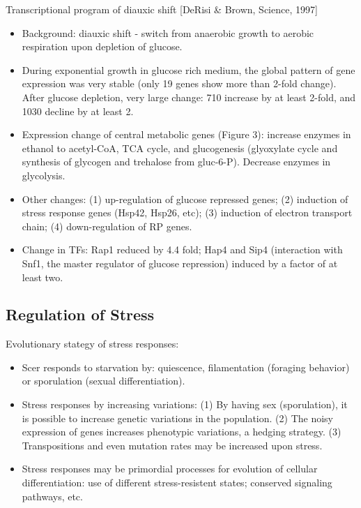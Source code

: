 \documentclass{report}
\begin{document}
Transcriptional program of diauxic shift [DeRisi \& Brown, Science, 1997]
\begin{itemize}
\item Background: diauxic shift - switch from anaerobic growth to aerobic respiration upon depletion of glucose. 

	\item During exponential growth in glucose rich medium, the global pattern of gene expression was very stable (only 19 genes show more than 2-fold change). After glucose depletion, very large change: 710 increase by at least 2-fold, and 1030 decline by at least 2. 
	\item Expression change of central metabolic genes (Figure 3): increase enzymes in ethanol to acetyl-CoA, TCA cycle, and glucogenesis (glyoxylate cycle and synthesis of glycogen and trehalose from gluc-6-P). Decrease enzymes in glycolysis. 
	\item Other changes: (1) up-regulation of glucose repressed genes; (2) induction of stress response genes (Hsp42, Hsp26, etc); (3) induction of electron transport chain; (4) down-regulation of RP genes. 
	\item Change in TFs: Rap1 reduced by 4.4 fold; Hap4 and Sip4 (interaction with Snf1, the master regulator of glucose repression) induced by a factor of at least two. 

\end{itemize}

\subsection{Regulation of Stress}

Evolutionary stategy of stress responses: 
\begin{itemize}
	\item Scer responds to starvation by: quiescence, filamentation (foraging behavior) or sporulation (sexual differentiation). 
	\item Stress responses by increasing variations: (1) By having sex (sporulation), it is possible to increase genetic variations in the population. (2) The noisy expression of genes increases phenotypic variations, a hedging strategy. (3) Transpositions and even mutation rates may be increased upon stress. 
	\item Stress responses may be primordial processes for evolution of cellular differentiation: use of different stress-resistent states; conserved signaling pathways, etc. 
\end{itemize}
\end{document}
